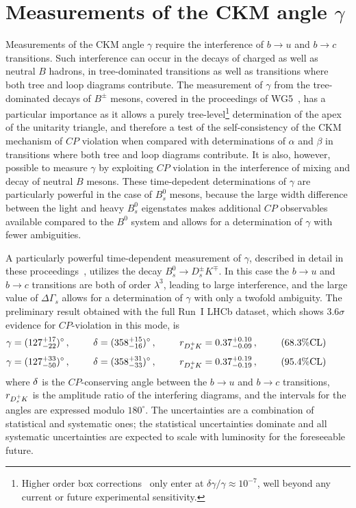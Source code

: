 \section{Measurements of the CKM angle $\gamma$}
\label{sec:gamma}
Measurements of the CKM angle $\gamma$ require the interference of $b\to u$ and $b\to c$ transitions.
Such interference can occur in the decays of charged as well as neutral $B$ hadrons, in tree-dominated
transitions as well as transitions where both tree and loop diagrams contribute.
The measurement of $\gamma$ from the tree-dominated decays of $B^\pm$ mesons, covered in the 
proceedings of WG5~\cite{WG5PROC}, has a particular importance as it allows a purely tree-level\footnote{Higher order box corrections~\cite{ZupanBrodGamma}
only enter at $\delta\gamma/\gamma \approx 10^{-7}$, well beyond any current or future experimental sensitivity.}
determination of the apex of the unitarity triangle, and therefore a test of the self-consistency of the CKM
mechanism of $CP$ violation when compared with determinations of $\alpha$ and $\beta$ in transitions where
both tree and loop diagrams contribute. It is also, however, possible to measure $\gamma$ by exploiting
$CP$ violation in the interference of mixing and decay of neutral $B$ mesons. These time-depedent determinations
of $\gamma$ are particularly powerful in the case of $B^0_s$ mesons, because the large width difference between
the light and heavy $B^0_s$ eigenstates makes additional $CP$ observables available compared
to the $B^0$ system and allows for a determination of $\gamma$ with fewer ambiguities. 

A particularly powerful time-dependent measurement of $\gamma$, described in detail in these proceedings~\cite{DSK}, utilizes the decay $B^0_s \to D^\pm_s K^\mp$.
In this case the $b\to u$ and $b\to c$ transitions are both of order $\lambda^3$, leading to large interference, and
the large value of $\Delta\Gamma_s$ allows for a determination of $\gamma$ with only a twofold ambiguity. 
The preliminary result obtained with the full Run~I LHCb dataset, which shows $3.6\sigma$ evidence for $CP$-violation in this mode, is
\begin{equation}
\gamma      = (127_{-22}^{+17})^\circ\,,\phantom{space}
\delta = (  358_{-16}^{+15})^\circ\,,\phantom{space}
r_{{{D}^+_{s}}\hspace{-0.0625em} K}   = 0.37_{-0.09}^{+0.10}\,,\phantom{space}
(68.3\% \textrm{CL})\phantom{space}  
\end{equation}
\begin{equation}
\gamma      = (127_{-50}^{+33})^\circ\,,\phantom{space}
\delta = (  358_{-33}^{+31})^\circ\,,\phantom{space}
r_{{{D}^+_{s}}\hspace{-0.0625em} K}   = 0.37_{-0.19}^{+0.19}\,,\phantom{space}
(95.4\% \textrm{CL})\phantom{space}  
\end{equation}
where $\delta$ is the $CP$-conserving angle between the $b\to u$ and $b\to c$ transitions,
$r_{{{D}^+_{s}}\hspace{-0.0625em} K}$ is the amplitude ratio of the interfering diagrams, and the intervals for the angles are expressed modulo $180^\circ$.
The uncertainties are a combination of statistical and systematic ones; the statistical uncertainties dominate
and all systematic uncertainties are expected to scale with luminosity for the foreseeable future.

